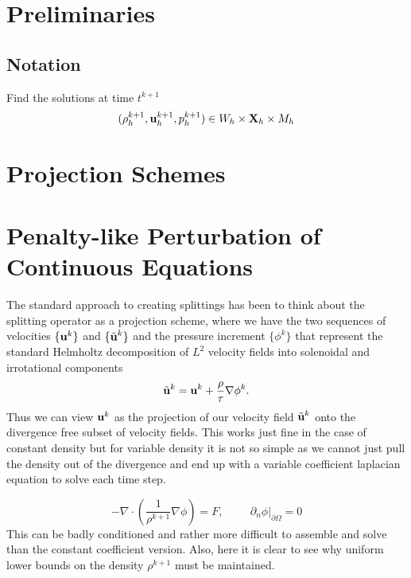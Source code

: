 \documentclass[letterpaper]{erdc}
\begin{document}
%
%
%
\section{Preliminaries}


%
%
\subsection{Notation}
Find the solutions at time $t^{k+1}$
\begin{equation}(\rho^{k+1}_h, \textbf{u}^{k+1}_{h}, p^{k+1}_h) \in W_h\times\textbf{X}_h\times M_h  \end{equation}


%
%
%
\section{Projection Schemes}


%
%
%
\section{Penalty-like Perturbation of Continuous Equations}
The standard approach to creating splittings has been to think about the splitting operator as a projection scheme, where we have the two sequences of velocities $\{\textbf{u}^{k}\}$ and $\{\tilde{\textbf{u}}^{k}\}$ and the pressure increment $\{\phi^{k}\}$ that represent the standard Helmholtz decomposition of $L^{2}$ velocity fields into solenoidal and irrotational components
\begin{equation}
  \tilde{\textbf{u}}^{k} = \textbf{u}^{k} + \frac{\rho}{\tau}\nabla \phi^{k}.
\end{equation}
Thus we can view $\textbf{u}^{k}$ as the projection of our velocity field $\tilde{\textbf{u}}^{k}$ onto the divergence free subset of velocity fields.  This works just fine in the case of constant density but for variable density it is not so simple as we cannot just pull the density out of the divergence and end up with a variable coefficient laplacian equation to solve each time step.

\begin{equation}
  -\nabla\cdot\left(\frac{1}{\rho^{k+1}} \nabla\phi \right) = F,  \hspace{1cm} \left.\partial_n \phi\right|_{\partial\Omega} = 0
\end{equation}  
This can be badly conditioned and rather more difficult to assemble and solve than the constant coefficient version.  Also, here it is clear to see why uniform lower bounds on the density $\rho^{k+1}$ must be maintained.
\end{document}
